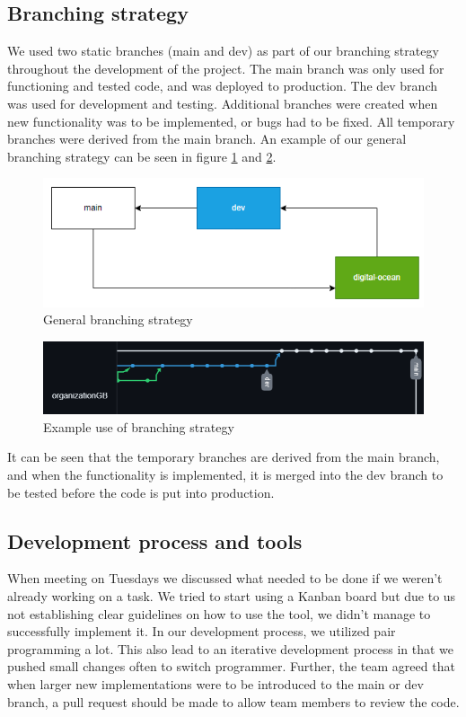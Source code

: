 \subsection{Branching strategy} \label{branching}
We used two static branches (main and dev) as part of our branching strategy throughout the development of the project. 
The main branch was only used for functioning and tested code, and was deployed to production. The dev branch was used for development and testing. Additional branches were created when new functionality was to be implemented, or bugs had to be
fixed. All temporary branches were derived from the main branch. An example of our general branching strategy can be seen in figure \ref{fig:gen_branch} and \ref{fig:ex_branch}.

\begin{figure}[H]
    \centering
    \captionsetup{justification=centering,margin=1cm}
    \includegraphics[width=0.7\linewidth]{report/images/branching.png}
    \caption{General branching strategy}
    \label{fig:gen_branch}
\end{figure}

\begin{figure}[H]
    \centering
    \captionsetup{justification=centering,margin=1cm}
    \includegraphics[width=0.7\linewidth]{report/images/git_branching.png}
    \caption{Example use of branching strategy}
    \label{fig:ex_branch}
\end{figure}

It can be seen that the temporary branches are derived from the main branch, and when the functionality is implemented, 
it is merged into the dev branch to be tested before the code is put into production. 

\subsection{Development process and tools}
When meeting on Tuesdays we discussed what needed to be done if we weren't already working on a task. We tried to start using a Kanban board but due to us not establishing 
clear guidelines on how to use the tool, we didn't manage to successfully implement it. In our development process, we utilized pair programming a lot. This also lead to an iterative development process in that we pushed small changes often to switch programmer. Further, the team agreed that when larger new implementations were to be introduced to the main or dev branch, a pull request should be made to allow team members to review the code.

